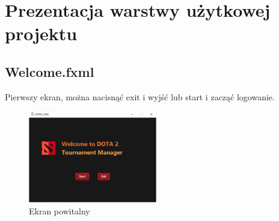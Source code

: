 \chapter{Prezentacja warstwy użytkowej projektu}
\label{cha:PrezentacjaGUI}

\section{Welcome.fxml}

Pierwszy ekran, można nacisnąć exit i wyjść lub start i zacząć logowanie.
\begin{figure}[H]
    \centering
    \includegraphics[width=0.5\textwidth]{figures/Welcome.png}
    \caption{Ekran powitalny \label{fig:welcome}}
\end{figure}

